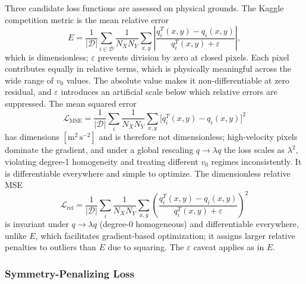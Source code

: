 \documentclass[conference,compsoc]{IEEEtran}
\begin{document}
Three candidate loss functions are assessed on physical grounds. The Kaggle competition metric is the mean relative error
\begin{equation}
  E = \frac{1}{|\mathcal{D}|}\sum_{i\in\mathcal{D}}
      \frac{1}{N_X N_Y}\sum_{x,y}
      \left|\frac{q_i^T(x,y)-q_i(x,y)}{q_i^T(x,y)+\varepsilon}\right|,
  \label{eq:kaggle-loss}
\end{equation}
which is dimensionless; $\varepsilon$ prevents division by zero at closed pixels. Each pixel contributes equally in relative terms, which is physically meaningful across the wide range of $v_0$ values. The absolute value makes it non-differentiable at zero residual, and $\varepsilon$ introduces an artificial scale below which relative errors are suppressed. The mean squared error
\begin{equation}
  \mathcal{L}_\mathrm{MSE} = \frac{1}{|\mathcal{D}|}\sum_{i}
    \frac{1}{N_X N_Y}\sum_{x,y}
    \bigl[q_i^T(x,y) - q_i(x,y)\bigr]^2
  \label{eq:mse-loss}
\end{equation}
has dimensions $[\mathrm{m^2\,s^{-2}}]$ and is therefore not dimensionless; high-velocity pixels dominate the gradient, and under a global rescaling $q\to\lambda q$ the loss scales as $\lambda^2$, violating degree-1 homogeneity and treating different $v_0$ regimes inconsistently. It is differentiable everywhere and simple to optimize. The dimensionless relative MSE
\begin{equation}
  \mathcal{L}_\mathrm{rel} = \frac{1}{|\mathcal{D}|}\sum_{i}
    \frac{1}{N_X N_Y}\sum_{x,y}
    \left(\frac{q_i^T(x,y) - q_i(x,y)}{q_i^T(x,y)+\varepsilon}\right)^2
  \label{eq:rel-mse-loss}
\end{equation}
is invariant under $q\to\lambda q$ (degree-0 homogeneous) and differentiable everywhere, unlike $E$, which facilitates gradient-based optimization; it assigns larger relative penalties to outliers than $E$ due to squaring. The $\varepsilon$ caveat applies as in $E$.

\subsubsection{Symmetry-Penalizing Loss}
\end{document}
